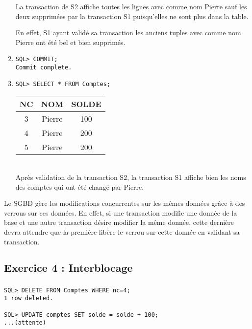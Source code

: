 \documentclass{article}
\begin{document}
\begin{enumerate}[label=\arabic*)]
La transaction de S2 affiche toutes les lignes avec comme nom Pierre sauf les deux supprimées par la transaction S1 puisqu'elles ne sont plus dans la table. 

En effet, S1 ayant validé sa transaction les anciens tuples avec comme nom Pierre ont été bel et bien supprimés.

	\item {}
		\begin{lstlisting}
SQL> COMMIT;
Commit complete.
		\end{lstlisting}

	\item {}
		\begin{lstlisting}
SQL> SELECT * FROM Comptes;
		\end{lstlisting}

\begin{tabular}{|c|c|c|}
	\hline
        	NC & NOM & SOLDE \\
	\hline        
	3 & Pierre & 100 \\
	\hline
	4 & Pierre & 200 \\
	\hline
	5 & Pierre & 200 \\
	\hline
\end{tabular} \\

Après validation de la transaction S2, la transaction S1 affiche bien les noms des comptes qui ont été changé par Pierre.

\end{enumerate}

Le SGBD gère les modifications concurrentes sur les mêmes données grâce à des verrous sur ces données. En effet, si une transaction modifie une donnée de la base et une autre transaction désire modifier la même donnée, cette dernière devra attendre que la première libère le verrou sur cette donnée en validant sa transaction.

\subsection*{Exercice 4 : Interblocage}

\subsubsection*{}
\begin{lstlisting}
SQL> DELETE FROM Comptes WHERE nc=4;
1 row deleted.

SQL> UPDATE comptes SET solde = solde + 100;
...(attente)

\end{lstlisting}
\end{document}
